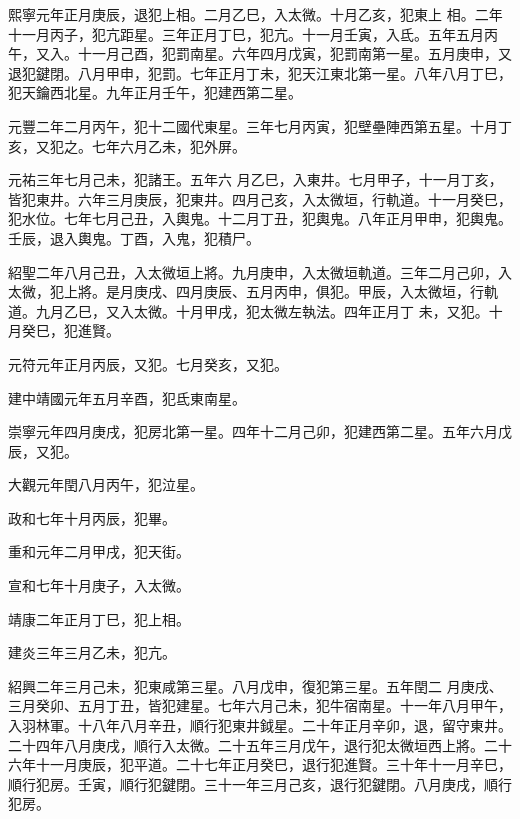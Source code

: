 \begin{pinyinscope}
 熙寧元年正月庚辰，退犯上相。二月乙巳，入太微。十月乙亥，犯東上
 相。二年十一月丙子，犯亢距星。三年正月丁巳，犯亢。十一月壬寅，入氐。五年五月丙午，又入。十一月己酉，犯罰南星。六年四月戊寅，犯罰南第一星。五月庚申，又退犯鍵閉。八月甲申，犯罰。七年正月丁未，犯天江東北第一星。八年八月丁巳，犯天鑰西北星。九年正月壬午，犯建西第二星。



 元豐二年二月丙午，犯十二國代東星。三年七月丙寅，犯壁壘陣西第五星。十月丁亥，又犯之。七年六月乙未，犯外屏。



 元祐三年七月己未，犯諸王。五年六
 月乙巳，入東井。七月甲子，十一月丁亥，皆犯東井。六年三月庚辰，犯東井。四月己亥，入太微垣，行軌道。十一月癸巳，犯水位。七年七月己丑，入輿鬼。十二月丁丑，犯輿鬼。八年正月甲申，犯輿鬼。壬辰，退入輿鬼。丁酉，入鬼，犯積尸。



 紹聖二年八月己丑，入太微垣上將。九月庚申，入太微垣軌道。三年二月己卯，入太微，犯上將。是月庚戌、四月庚辰、五月丙申，俱犯。甲辰，入太微垣，行軌道。九月乙巳，又入太微。十月甲戌，犯太微左執法。四年正月丁
 未，又犯。十月癸巳，犯進賢。



 元符元年正月丙辰，又犯。七月癸亥，又犯。



 建中靖國元年五月辛酉，犯氐東南星。



 崇寧元年四月庚戌，犯房北第一星。四年十二月己卯，犯建西第二星。五年六月戊辰，又犯。



 大觀元年閏八月丙午，犯泣星。



 政和七年十月丙辰，犯畢。



 重和元年二月甲戌，犯天街。



 宣和七年十月庚子，入太微。



 靖康二年正月丁巳，犯上相。



 建炎三年三月乙未，犯亢。



 紹興二年三月己未，犯東咸第三星。八月戊申，復犯第三星。五年閏二
 月庚戌、三月癸卯、五月丁丑，皆犯建星。七年六月己未，犯牛宿南星。十一年八月甲午，入羽林軍。十八年八月辛丑，順行犯東井鉞星。二十年正月辛卯，退，留守東井。二十四年八月庚戌，順行入太微。二十五年三月戊午，退行犯太微垣西上將。二十六年十一月庚辰，犯平道。二十七年正月癸巳，退行犯進賢。三十年十一月辛巳，順行犯房。壬寅，順行犯鍵閉。三十一年三月己亥，退行犯鍵閉。八月庚戌，順行犯房。




\end{pinyinscope}
